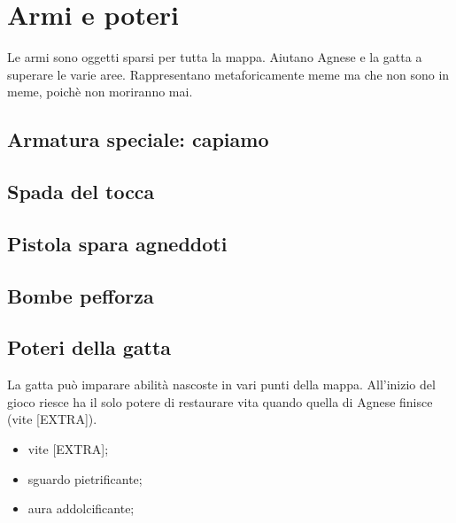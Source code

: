 \section{Armi e poteri}
    Le armi sono oggetti sparsi per tutta la mappa. Aiutano Agnese e la gatta a superare le varie aree.
    Rappresentano metaforicamente meme ma che non sono in meme, poichè non moriranno mai.

    \subsection{Armatura speciale: capiamo}
    
    \subsection{Spada del tocca}
    
    \subsection{Pistola spara agneddoti}
    
    \subsection{Bombe pefforza}
    
    \subsection{Poteri della gatta}
        La gatta può imparare abilità nascoste in vari punti della mappa.
        All'inizio del gioco riesce ha il solo potere di restaurare vita quando
        quella di Agnese finisce (vite [EXTRA]).
        
        \begin{itemize}
            \item{vite [EXTRA];}
            \item{sguardo pietrificante;}
            \item{aura addolcificante;}
        \end{itemize}
